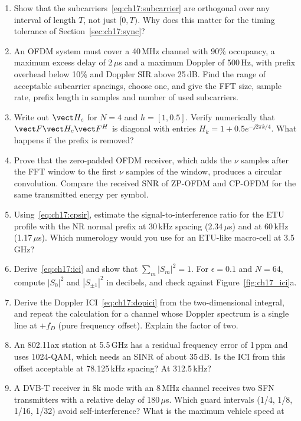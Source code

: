 \problems
\begin{enumerate}[label=\thechapter.\arabic*]
\item Show that the subcarriers~\eqref{eq:ch17:subcarrier} are orthogonal over any interval of length $T$, not just
$[0,T)$. Why does this matter for the timing tolerance of Section~\ref{sec:ch17:sync}?
\item An OFDM system must cover a 40\,MHz channel with 90\% occupancy, a maximum excess delay of 2\,$\mu$s and a maximum
Doppler of 500\,Hz, with prefix overhead below 10\% and Doppler SIR above 25\,dB. Find the range of acceptable subcarrier
spacings, choose one, and give the FFT size, sample rate, prefix length in samples and number of used subcarriers.
\item Write out $\vect H_c$ for $N=4$ and $h=[1,0.5]$. Verify numerically that $\vect F\vect H_c\vect F^H$ is diagonal
with entries $H_k=1+0.5e^{-j2\pi k/4}$. What happens if the prefix is removed?
\item Prove that the zero-padded OFDM receiver, which adds the $\nu$ samples after the FFT window to the first $\nu$
samples of the window, produces a circular convolution. Compare the received SNR of ZP-OFDM and CP-OFDM for the same
transmitted energy per symbol.
\item Using~\eqref{eq:ch17:cpsir}, estimate the signal-to-interference ratio for the ETU profile with the NR normal
prefix at 30\,kHz spacing (2.34\,$\mu$s) and at 60\,kHz (1.17\,$\mu$s). Which numerology would you use for an ETU-like
macro-cell at 3.5\,GHz?
\item Derive~\eqref{eq:ch17:ici} and show that $\sum_m|S_m|^2=1$. For $\epsilon=0.1$ and $N=64$, compute $|S_0|^2$ and
$|S_{\pm1}|^2$ in decibels, and check against Figure~\ref{fig:ch17_ici}a.
\item Derive the Doppler ICI~\eqref{eq:ch17:dopici} from the two-dimensional integral, and repeat the calculation
for a channel whose Doppler spectrum is a single line at $+f_D$ (pure frequency offset). Explain the factor of two.
\item An 802.11ax station at 5.5\,GHz has a residual frequency error of 1\,ppm and uses 1024-QAM, which needs an SINR of
about 35\,dB. Is the ICI from this offset acceptable at 78.125\,kHz spacing? At 312.5\,kHz?
\item A DVB-T receiver in 8k mode with an 8\,MHz channel receives two SFN transmitters with a relative delay of
180\,$\mu$s. Which guard intervals (1/4, 1/8, 1/16, 1/32) avoid self-interference? What is the maximum vehicle speed at

\end{enumerate}
